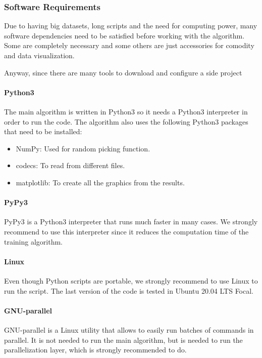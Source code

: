 \documentclass[11pt]{article}
\begin{document}
    \subsubsection{Software Requirements}
    Due to having big datasets, long scripts and the need for computing power, many software dependencies need to be satisfied before working with the algorithm. Some are completely necessary and some others are just accessories for comodity and data visualization.
    \par 
    Anyway, since there are many tools to download and configure a side project
      \paragraph{Python3}     
      The main algorithm is written in Python3 so it needs a Python3 interpreter in order to run the code. The algorithm also uses the following Python3 packages that need to be installed:
        \begin{itemize}
          \item NumPy: Used for random picking function.
          \item codecs: To read from different files.
          \item matplotlib: To create all the graphics from the results.
        \end{itemize}
      \paragraph{PyPy3}
      PyPy3 is a Python3 interpreter that runs much faster in many cases. We strongly recommend to use this interpreter since it reduces the computation time of the training algorithm.
      \paragraph{Linux}
      Even though Python scripts are portable, we strongly recommend to use Linux to run the script. The last version of the code is tested in Ubuntu 20.04 LTS Focal.
      \paragraph{GNU-parallel}
      GNU-parallel is a Linux utility that allows to easily run batches of commands in parallel. It is not needed to run the main algorithm, but is needed to run the parallelization layer, which is strongly recommended to do.
\end{document}
